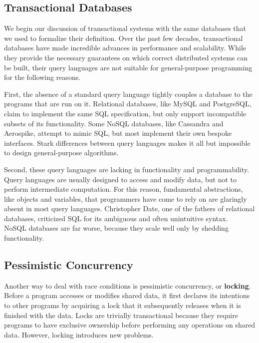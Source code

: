 \documentclass[../main.tex]{subfiles}
\begin{document}
  \subsection{Transactional Databases}
  We begin our discussion of transactional systems with the same databases that we used to formalize
  their definition. Over the past few decades, transactional databases have made incredible advances
  in performance and scalability. While they provide the necessary guarantees on which correct
  distributed systems can be built, their query languages are not suitable for general-purpose
  programming for the following reasons.

  First, the absence of a standard query language tightly couples a database to the programs that
  are run on it. Relational databases, like MySQL and PostgreSQL, claim to implement the same SQL
  specification, but only support incompatible subsets of its functionality. Some NoSQL
  databases, like Cassandra and Aerospike, attempt to mimic SQL, but most implement their own
  bespoke interfaces. Stark differences between query languages makes it all but impossible to
  design general-purpose algorithms.

  Second, these query languages are lacking in functionality and programmability. Query languages
  are usually designed to access and modify data, but not to perform intermediate computation. For
  this reason, fundamental abstractions, like objects and variables, that programmers have come to
  rely on are glaringly absent in most query languages. Christopher Date, one of the fathers of
  relational databases, criticized SQL for its ambiguous and often unintuitive syntax.~\cite{sql}
  NoSQL databases are far worse, because they scale well only by shedding functionality.

  \subsection{Pessimistic Concurrency}
  Another way to deal with race conditions is pessimistic concurrency, or \textbf{locking}.
  Before a program accesses or modifies shared data, it first declares its intentions to other
  programs by acquiring a lock that it subsequently releases when it is finished with the data.
  Locks are trivially transactional because they require programs to have exclusive ownership before
  performing any operations on shared data. However, locking introduces new problems.
\end{document}
